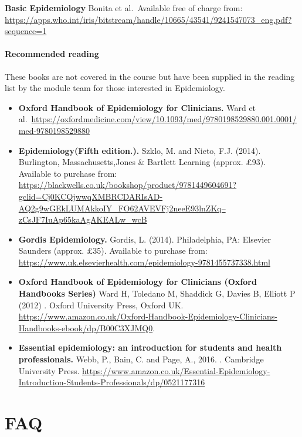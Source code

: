 \documentclass[
]{book}
\begin{document}
\textbf{Basic Epidemiology} Bonita et al.~Available free of charge from: \url{https://apps.who.int/iris/bitstream/handle/10665/43541/9241547073_eng.pdf?sequence=1}

\subsubsection*{Recommended reading}\label{recommended-reading}

These books are not covered in the course but have been supplied in the reading list by the module team for those interested in Epidemiology.

\begin{itemize}
\item
  \textbf{Oxford Handbook of Epidemiology for Clinicians.} Ward et al.~\url{https://oxfordmedicine.com/view/10.1093/med/9780198529880.001.0001/med-9780198529880}
\item
  \textbf{Epidemiology(Fifth edition.).} Szklo, M. and Nieto, F.J. (2014). Burlington, Massachusetts,Jones \& Bartlett Learning (approx. £93). Available to purchase from: \href{https://blackwells.co.uk/bookshop/product/9781449604691?gclid=Cj0KCQjwwqXMBRCDARIsAD-AQ2g9wGEkLUMAkkoIY_FO62AVEVFj2neeE93lnZKq--zCsJF7IuAp65kaAgAKEALw_wcB}{https://blackwells.co.uk/bookshop/product/9781449604691?gclid=Cj0KCQjwwqXMBRCDARIsAD-AQ2g9wGEkLUMAkkoIY\_FO62AVEVFj2neeE93lnZKq--zCsJF7IuAp65kaAgAKEALw\_wcB}
\item
  \textbf{Gordis Epidemiology.} Gordis, L. (2014). Philadelphia, PA: Elsevier Saunders (approx. £35). Available to purchase from: \url{https://www.uk.elsevierhealth.com/epidemiology-9781455737338.html}
\item
  \textbf{Oxford Handbook of Epidemiology for Clinicians (Oxford Handbooks Series)} Ward H, Toledano M, Shaddick G, Davies B, Elliott P (2012) . Oxford University Press, Oxford UK. \href{Available\%20new\%20or\%20used}{https://www.amazon.co.uk/Oxford-Handbook-Epidemiology-Clinicians-Handbooks-ebook/dp/B00C3XJMQ0}.
\item
  \textbf{Essential epidemiology: an introduction for students and health professionals.} Webb, P., Bain, C. and Page, A., 2016. . Cambridge University Press. \url{https://www.amazon.co.uk/Essential-Epidemiology-Introduction-Students-Professionals/dp/0521177316}
\end{itemize}

\chapter{FAQ}\label{faq}
\end{document}
